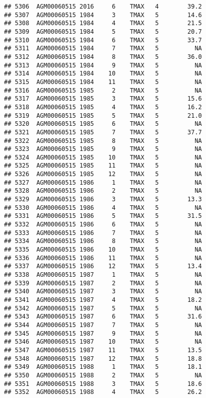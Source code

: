 \documentclass{article}\usepackage[]{graphicx}\usepackage[]{color}
\makeatletter
\newenvironment{kframe}{%
 \def\at@end@of@kframe{}%
 \ifinner\ifhmode%
  \def\at@end@of@kframe{\end{minipage}}%
  \begin{minipage}{\columnwidth}%
 \fi\fi%
 \def\FrameCommand##1{\hskip\@totalleftmargin \hskip-\fboxsep
 \colorbox{shadecolor}{##1}\hskip-\fboxsep
     \hskip-\linewidth \hskip-\@totalleftmargin \hskip\columnwidth}%
 \MakeFramed {\advance\hsize-\width
   \@totalleftmargin\z@ \linewidth\hsize
   \@setminipage}}%
 {\par\unskip\endMakeFramed%
 \at@end@of@kframe}
\newenvironment{knitrout}{}{} %
\makeatother
\begin{document}
\begin{knitrout}
\begin{kframe}
\begin{verbatim}
## 5306  AGM00060515 2016     6    TMAX   4        39.2
## 5307  AGM00060515 1984     3    TMAX   5        14.6
## 5308  AGM00060515 1984     4    TMAX   5        21.5
## 5309  AGM00060515 1984     5    TMAX   5        20.7
## 5310  AGM00060515 1984     6    TMAX   5        33.7
## 5311  AGM00060515 1984     7    TMAX   5          NA
## 5312  AGM00060515 1984     8    TMAX   5        36.0
## 5313  AGM00060515 1984     9    TMAX   5          NA
## 5314  AGM00060515 1984    10    TMAX   5          NA
## 5315  AGM00060515 1984    11    TMAX   5          NA
## 5316  AGM00060515 1985     2    TMAX   5          NA
## 5317  AGM00060515 1985     3    TMAX   5        15.6
## 5318  AGM00060515 1985     4    TMAX   5        16.2
## 5319  AGM00060515 1985     5    TMAX   5        21.0
## 5320  AGM00060515 1985     6    TMAX   5          NA
## 5321  AGM00060515 1985     7    TMAX   5        37.7
## 5322  AGM00060515 1985     8    TMAX   5          NA
## 5323  AGM00060515 1985     9    TMAX   5          NA
## 5324  AGM00060515 1985    10    TMAX   5          NA
## 5325  AGM00060515 1985    11    TMAX   5          NA
## 5326  AGM00060515 1985    12    TMAX   5          NA
## 5327  AGM00060515 1986     1    TMAX   5          NA
## 5328  AGM00060515 1986     2    TMAX   5          NA
## 5329  AGM00060515 1986     3    TMAX   5        13.3
## 5330  AGM00060515 1986     4    TMAX   5          NA
## 5331  AGM00060515 1986     5    TMAX   5        31.5
## 5332  AGM00060515 1986     6    TMAX   5          NA
## 5333  AGM00060515 1986     7    TMAX   5          NA
## 5334  AGM00060515 1986     8    TMAX   5          NA
## 5335  AGM00060515 1986    10    TMAX   5          NA
## 5336  AGM00060515 1986    11    TMAX   5          NA
## 5337  AGM00060515 1986    12    TMAX   5        13.4
## 5338  AGM00060515 1987     1    TMAX   5          NA
## 5339  AGM00060515 1987     2    TMAX   5          NA
## 5340  AGM00060515 1987     3    TMAX   5          NA
## 5341  AGM00060515 1987     4    TMAX   5        18.2
## 5342  AGM00060515 1987     5    TMAX   5          NA
## 5343  AGM00060515 1987     6    TMAX   5        31.6
## 5344  AGM00060515 1987     7    TMAX   5          NA
## 5345  AGM00060515 1987     9    TMAX   5          NA
## 5346  AGM00060515 1987    10    TMAX   5          NA
## 5347  AGM00060515 1987    11    TMAX   5        13.5
## 5348  AGM00060515 1987    12    TMAX   5        18.8
## 5349  AGM00060515 1988     1    TMAX   5        18.1
## 5350  AGM00060515 1988     2    TMAX   5          NA
## 5351  AGM00060515 1988     3    TMAX   5        18.6
## 5352  AGM00060515 1988     4    TMAX   5        26.2

\end{verbatim}
\end{kframe}
\end{knitrout}
\end{document}
